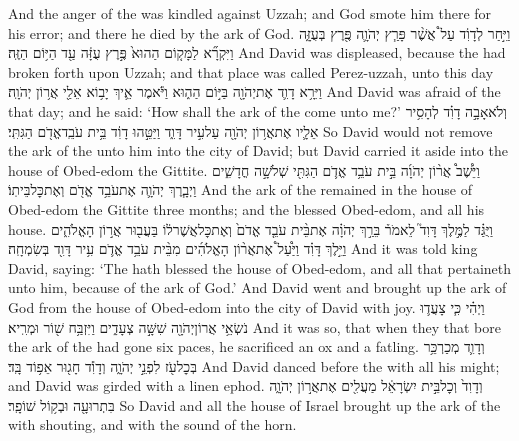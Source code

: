 {And the anger of the \lord\space was kindled against Uzzah; and God smote him there for his error; and there he died by the ark of God.}
{וַיִּ֣חַר לְדָוִ֔ד עַל֩ אֲשֶׁ֨ר פָּרַ֧ץ יְהֹוָ֛ה פֶּ֖רֶץ בְּעֻזָּ֑ה וַיִּקְרָ֞א לַמָּק֤וֹם הַהוּא֙ פֶּ֣רֶץ עֻזָּ֔ה עַ֖ד הַיּ֥וֹם הַזֶּֽה׃}
{And David was displeased, because the \lord\space had broken forth upon Uzzah; and that place was called Perez-uzzah, unto this day}
{וַיִּרָ֥א דָוִ֛ד אֶת\maqqaf יְהֹוָ֖ה בַּיּ֣וֹם הַה֑וּא וַיֹּ֕אמֶר אֵ֛יךְ יָב֥וֹא אֵלַ֖י אֲר֥וֹן יְהֹוָֽה׃}
{And David was afraid of the \lord\space that day; and he said: ‘How shall the ark of the \lord\space come unto me?’}
{וְלֹא\maqqaf אָבָ֣ה דָוִ֗ד לְהָסִ֥יר אֵלָ֛יו אֶת\maqqaf אֲר֥וֹן יְהֹוָ֖ה עַל\maqqaf עִ֣יר דָּוִ֑ד וַיַּטֵּ֣הוּ דָוִ֔ד בֵּ֥ית עֹבֵֽד\maqqaf אֱדֹ֖ם הַגִּתִּֽי׃}
{So David would not remove the ark of the \lord\space unto him into the city of David; but David carried it aside into the house of Obed-edom the Gittite.}
{וַיֵּ֩שֶׁב֩ אֲר֨וֹן יְהֹוָ֜ה בֵּ֣ית עֹבֵ֥ד אֱדֹ֛ם הַגִּתִּ֖י שְׁלֹשָׁ֣ה חֳדָשִׁ֑ים וַיְבָ֧רֶךְ יְהֹוָ֛ה אֶת\maqqaf עֹבֵ֥ד אֱדֹ֖ם וְאֶת\maqqaf כׇּל\maqqaf בֵּיתֽוֹ׃}
{And the ark of the \lord\space remained in the house of Obed-edom the Gittite three months; and the \lord\space blessed Obed-edom, and all his house.}
{וַיֻּגַּ֗ד לַמֶּ֣לֶךְ דָּוִד֮ לֵאמֹר֒ בֵּרַ֣ךְ יְהֹוָ֗ה אֶת\maqqaf בֵּ֨ית עֹבֵ֤ד אֱדֹם֙ וְאֶת\maqqaf כׇּל\maqqaf אֲשֶׁר\maqqaf ל֔וֹ בַּעֲב֖וּר אֲר֣וֹן הָאֱלֹהִ֑ים וַיֵּ֣לֶךְ דָּוִ֗ד וַיַּ֩עַל֩ אֶת\maqqaf אֲר֨וֹן הָאֱלֹהִ֜ים מִבֵּ֨ית עֹבֵ֥ד אֱדֹ֛ם עִ֥יר דָּוִ֖ד בְּשִׂמְחָֽה׃}
{And it was told king David, saying: ‘The \lord\space hath blessed the house of Obed-edom, and all that pertaineth unto him, because of the ark of God.’ And David went and brought up the ark of God from the house of Obed-edom into the city of David with joy.}
{וַיְהִ֗י כִּ֧י צָעֲד֛וּ נֹשְׂאֵ֥י אֲרוֹן\maqqaf יְהֹוָ֖ה שִׁשָּׁ֣ה צְעָדִ֑ים וַיִּזְבַּ֥ח שׁ֖וֹר וּמְרִֽיא׃}
{And it was so, that when they that bore the ark of the \lord\space had gone six paces, he sacrificed an ox and a fatling.}
{וְדָוִ֛ד מְכַרְכֵּ֥ר בְּכׇל\maqqaf עֹ֖ז לִפְנֵ֣י יְהֹוָ֑ה וְדָוִ֕ד חָג֖וּר אֵפ֥וֹד בָּֽד׃}
{And David danced before the \lord\space with all his might; and David was girded with a linen ephod.}
{וְדָוִד֙ וְכׇל\maqqaf בֵּ֣ית יִשְׂרָאֵ֔ל מַעֲלִ֖ים אֶת\maqqaf אֲר֣וֹן יְהֹוָ֑ה בִּתְרוּעָ֖ה וּבְק֥וֹל שׁוֹפָֽר׃}
{So David and all the house of Israel brought up the ark of the \lord\space with shouting, and with the sound of the horn.}
